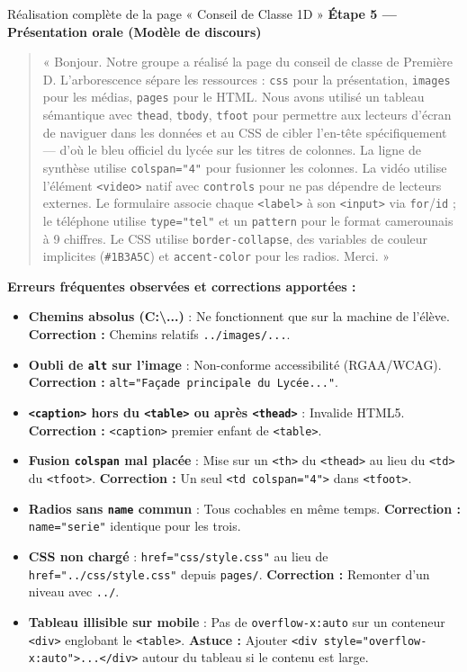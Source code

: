 \documentclass[11pt]{article}
\begin{document}
\begin{exoresolu}{Réalisation complète de la page « Conseil de Classe 1D »}
\textbf{Étape 5 — Présentation orale (Modèle de discours)}
\begin{quote}
« Bonjour. Notre groupe a réalisé la page du conseil de classe de Première D. 
L'arborescence sépare les ressources : \texttt{css} pour la présentation, \texttt{images} pour les médias, \texttt{pages} pour le HTML. 
Nous avons utilisé un tableau sémantique avec \texttt{thead}, \texttt{tbody}, \texttt{tfoot} pour permettre aux lecteurs d'écran de naviguer dans les données et au CSS de cibler l'en-tête spécifiquement — d'où le bleu officiel du lycée sur les titres de colonnes. 
La ligne de synthèse utilise \texttt{colspan="4"} pour fusionner les colonnes. 
La vidéo utilise l'élément \texttt{<video>} natif avec \texttt{controls} pour ne pas dépendre de lecteurs externes. 
Le formulaire associe chaque \texttt{<label>} à son \texttt{<input>} via \texttt{for}/\texttt{id} ; le téléphone utilise \texttt{type="tel"} et un \texttt{pattern} pour le format camerounais à 9 chiffres. 
Le CSS utilise \texttt{border-collapse}, des variables de couleur implicites (\texttt{\#1B3A5C}) et \texttt{accent-color} pour les radios. Merci. »
\end{quote}
\tcblower
\textbf{Erreurs fréquentes observées et corrections apportées :}
\begin{itemize}
    \item \textbf{Chemins absolus (C:\textbackslash...)} : Ne fonctionnent que sur la machine de l'élève. \textbf{Correction :} Chemins relatifs \texttt{../images/...}.
    \item \textbf{Oubli de \texttt{alt} sur l'image} : Non-conforme accessibilité (RGAA/WCAG). \textbf{Correction :} \texttt{alt="Façade principale du Lycée..."}.
    \item \textbf{\texttt{<caption>} hors du \texttt{<table>} ou après \texttt{<thead>}} : Invalide HTML5. \textbf{Correction :} \texttt{<caption>} premier enfant de \texttt{<table>}.
    \item \textbf{Fusion \texttt{colspan} mal placée} : Mise sur un \texttt{<th>} du \texttt{<thead>} au lieu du \texttt{<td>} du \texttt{<tfoot>}. \textbf{Correction :} Un seul \texttt{<td colspan="4">} dans \texttt{<tfoot>}.
    \item \textbf{Radios sans \texttt{name} commun} : Tous cochables en même temps. \textbf{Correction :} \texttt{name="serie"} identique pour les trois.
    \item \textbf{CSS non chargé} : \texttt{href="css/style.css"} au lieu de \texttt{href="../css/style.css"} depuis \texttt{pages/}. \textbf{Correction :} Remonter d'un niveau avec \texttt{../}.
    \item \textbf{Tableau illisible sur mobile} : Pas de \texttt{overflow-x:auto} sur un conteneur \texttt{<div>} englobant le \texttt{<table>}. \textbf{Astuce :} Ajouter \texttt{<div style="overflow-x:auto">...</div>} autour du tableau si le contenu est large.
\end{itemize}
\end{exoresolu}
\end{document}

